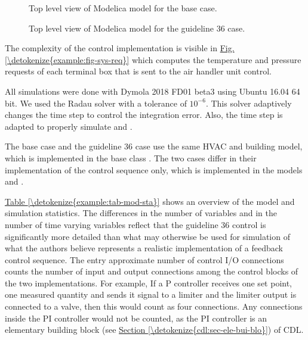 \documentclass[letterpaper,10pt, openany,english]{sphinxmanual}
\begin{document}
\begin{figure}[htbp]
\centering
\capstart

\noindent{}
\caption{Top level view of Modelica model for the base case.}\label{\detokenize{example:id20}}\label{\detokenize{example:fig-model-top-base}}\end{figure}

\begin{figure}[htbp]
\centering
\capstart

\noindent{}
\caption{Top level view of Modelica model for the guideline 36 case.}\label{\detokenize{example:id21}}\label{\detokenize{example:fig-model-top-guideline}}\end{figure}

The complexity of the control implementation is visible
in \hyperref[\detokenize{example:fig-sys-req}]{Fig.\@ \ref{\detokenize{example:fig-sys-req}}} which computes the temperature and pressure
requests of each terminal box that is sent to the air handler unit control.

All simulations were done with Dymola 2018 FD01 beta3 using Ubuntu 16.04 64 bit.
We used the Radau solver with a tolerance of \(10^{-6}\).
This solver adaptively changes the time step to control the integration error.
Also, the time step is adapted to properly simulate {\hyperref[\detokenize{glossary:term-time-event}]{}}
and {\hyperref[\detokenize{glossary:term-state-event}]{}}.

The base case and the guideline 36 case use the same HVAC and building model,
which is implemented in the base class
.
The two cases differ in their implementation of the control sequence only,
which is implemented in the models
 and
.

\hyperref[\detokenize{example:tab-mod-sta}]{Table \ref{\detokenize{example:tab-mod-sta}}} shows an overview of the model and simulation statistics.
The differences in the number of variables and in the number of time varying
variables reflect that the guideline 36 control is significantly more
detailed than what may otherwise be used for simulation of what the authors
believe represents a realistic implementation of a feedback control sequence.
The entry approximate number of control I/O connections
counts the number of input and output connections among the
control blocks of the two implementations. For example,
If a P controller receives one set point, one measured quantity
and sends it signal to a limiter and the limiter output is
connected to a valve, then this would count as four connections.
Any connections inside the PI controller would not be counted,
as the PI controller is an elementary building block
(see \hyperref[\detokenize{cdl:sec-ele-bui-blo}]{Section \ref{\detokenize{cdl:sec-ele-bui-blo}}}) of CDL.
\end{document}
